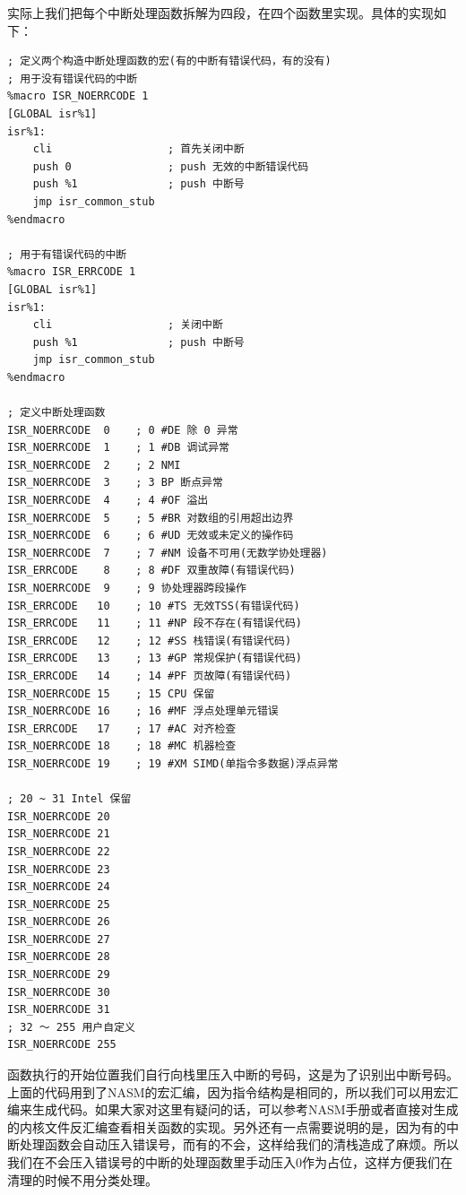 \par 实际上我们把每个中断处理函数拆解为四段，在四个函数里实现。具体的实现如下：

\begin{lstlisting}[language = {[x86masm]Assembler}, caption = idt/idt\_s.s]
; 定义两个构造中断处理函数的宏(有的中断有错误代码，有的没有)
; 用于没有错误代码的中断
%macro ISR_NOERRCODE 1
[GLOBAL isr%1]
isr%1:
	cli                  ; 首先关闭中断
	push 0               ; push 无效的中断错误代码
	push %1              ; push 中断号
	jmp isr_common_stub
%endmacro

; 用于有错误代码的中断
%macro ISR_ERRCODE 1
[GLOBAL isr%1]
isr%1:
	cli                  ; 关闭中断
	push %1              ; push 中断号
	jmp isr_common_stub
%endmacro

; 定义中断处理函数
ISR_NOERRCODE  0 	; 0 #DE 除 0 异常
ISR_NOERRCODE  1 	; 1 #DB 调试异常
ISR_NOERRCODE  2 	; 2 NMI
ISR_NOERRCODE  3 	; 3 BP 断点异常 
ISR_NOERRCODE  4 	; 4 #OF 溢出 
ISR_NOERRCODE  5 	; 5 #BR 对数组的引用超出边界 
ISR_NOERRCODE  6 	; 6 #UD 无效或未定义的操作码 
ISR_NOERRCODE  7 	; 7 #NM 设备不可用(无数学协处理器) 
ISR_ERRCODE    8 	; 8 #DF 双重故障(有错误代码) 
ISR_NOERRCODE  9 	; 9 协处理器跨段操作
ISR_ERRCODE   10 	; 10 #TS 无效TSS(有错误代码) 
ISR_ERRCODE   11 	; 11 #NP 段不存在(有错误代码) 
ISR_ERRCODE   12 	; 12 #SS 栈错误(有错误代码) 
ISR_ERRCODE   13 	; 13 #GP 常规保护(有错误代码) 
ISR_ERRCODE   14 	; 14 #PF 页故障(有错误代码) 
ISR_NOERRCODE 15 	; 15 CPU 保留 
ISR_NOERRCODE 16 	; 16 #MF 浮点处理单元错误 
ISR_ERRCODE   17 	; 17 #AC 对齐检查 
ISR_NOERRCODE 18 	; 18 #MC 机器检查 
ISR_NOERRCODE 19 	; 19 #XM SIMD(单指令多数据)浮点异常

; 20 ~ 31 Intel 保留
ISR_NOERRCODE 20
ISR_NOERRCODE 21
ISR_NOERRCODE 22
ISR_NOERRCODE 23
ISR_NOERRCODE 24
ISR_NOERRCODE 25
ISR_NOERRCODE 26
ISR_NOERRCODE 27
ISR_NOERRCODE 28
ISR_NOERRCODE 29
ISR_NOERRCODE 30
ISR_NOERRCODE 31
; 32 ～ 255 用户自定义
ISR_NOERRCODE 255
\end{lstlisting}

\par 函数执行的开始位置我们自行向栈里压入中断的号码，这是为了识别出中断号码。上面的代码用到了NASM的宏汇编，因为指令结构是相同的，所以我们可以用宏汇编来生成代码。如果大家对这里有疑问的话，可以参考NASM手册或者直接对生成的内核文件反汇编查看相关函数的实现。另外还有一点需要说明的是，因为有的中断处理函数会自动压入错误号，而有的不会，这样给我们的清栈造成了麻烦。所以我们在不会压入错误号的中断的处理函数里手动压入0作为占位，这样方便我们在清理的时候不用分类处理。

